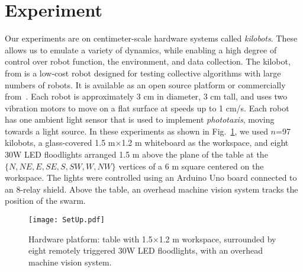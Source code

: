 
\section{Experiment}\label{sec:expResults}





Our experiments are on centimeter-scale hardware systems called \emph{kilobots}.  These allows us to emulate a variety of dynamics, while enabling a high degree of control over robot function, the environment, and data collection. The kilobot, from \cite{Rubenstein2012,rubenstein2014programmable} is a low-cost robot designed for testing collective algorithms with large numbers of robots. It is available as an open source platform or commercially from~\cite{K-Team2015}.  Each robot is approximately 3 cm in diameter, 3 cm tall, and uses two vibration motors to move on a flat surface at speeds up to 1 cm/s.  Each robot has one ambient light sensor that is used to implement \emph{phototaxis},  moving towards a light source. 
In these experiments as shown in Fig.~\ref{fig:setup}, we used $n$=97 kilobots, a glass-covered 1.5 m$\times$1.2 m whiteboard as the workspace, and eight 30W LED floodlights arranged 1.5 m above the plane of the table at the $\{N,NE,E,SE,S,SW,W,NW\}$ vertices of a 6 m square centered on the workspace. The lights were controlled using an Arduino Uno board connected to an 8-relay shield.  Above  the table, an overhead machine vision system tracks the position of the swarm.


\begin{figure}
\begin{center}
	\texttt{[image: SetUp.pdf]}
\end{center}
\vspace{-1em}
\caption{\label{fig:setup}
Hardware platform:  table with 1.5$\times$1.2 m workspace, surrounded by eight remotely triggered 30W LED floodlights, with an overhead machine vision system.
}
\vspace{-1.5em}
\end{figure}


